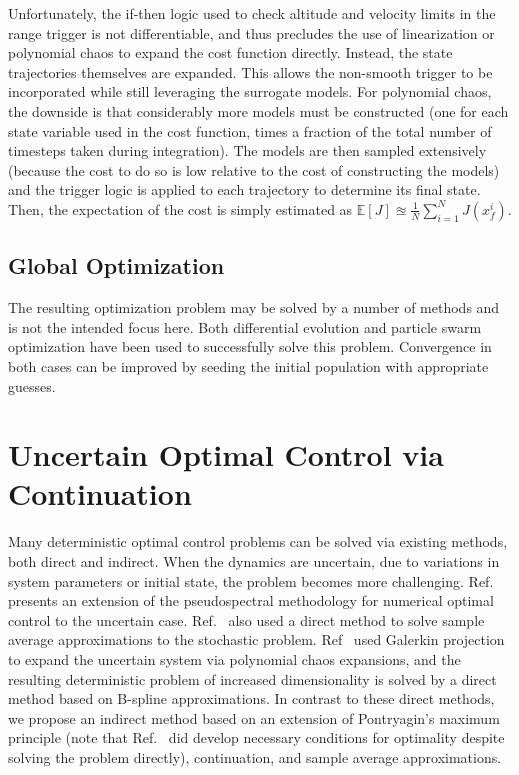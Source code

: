 \documentclass[10pt,a4paper]{article}
\begin{document}
	Unfortunately, the if-then logic used to check altitude and velocity limits in the range trigger is not differentiable, and thus precludes the use of linearization or polynomial chaos to expand the cost function directly. Instead, the state trajectories themselves are expanded. This allows the non-smooth trigger to be incorporated while still leveraging the surrogate models. For polynomial chaos, the downside is that considerably more models must be constructed (one for each state variable used in the cost function, times a fraction of the total number of timesteps taken during integration). The models are then sampled extensively (because the cost to do so is low relative to the cost of constructing the models) and the trigger logic is applied to each trajectory to determine its final state. Then, the expectation of the cost is simply estimated as $\mathbb{E}[J]\approxeq\frac{1}{N}\sum_{i=1}^{N}J(x_f^i)$. 
			
			
	\subsection{Global Optimization}
	The resulting optimization problem may be solved by a number of methods and is not the intended focus here. Both differential evolution and particle swarm optimization have been used to successfully solve this problem. Convergence in both cases can be improved by seeding the initial population with appropriate guesses. 	
	
	\section{Uncertain Optimal Control via Continuation}
	
	Many deterministic optimal control problems can be solved via existing methods, both direct and indirect. When the dynamics are uncertain, due to variations in system parameters or initial state, the problem becomes more challenging. Ref.~\cite{RSOptimalControl} presents an extension of the pseudospectral methodology for numerical optimal control to the uncertain case. Ref.~\cite{UncertainOptimalControl} also used a direct method to solve sample average approximations to the stochastic problem. Ref~\cite{PCE_OCP_Bhattacharya} used Galerkin projection to expand the uncertain system via polynomial chaos expansions, and the resulting deterministic problem of increased dimensionality is solved by a direct method based on B-spline approximations. In contrast to these direct methods, we propose an indirect method based on an extension of Pontryagin's maximum principle (note that Ref.~\cite{UncertainOptimalControl} did develop necessary conditions for optimality despite solving the problem directly), continuation, and sample average approximations. 
	
\end{document}
